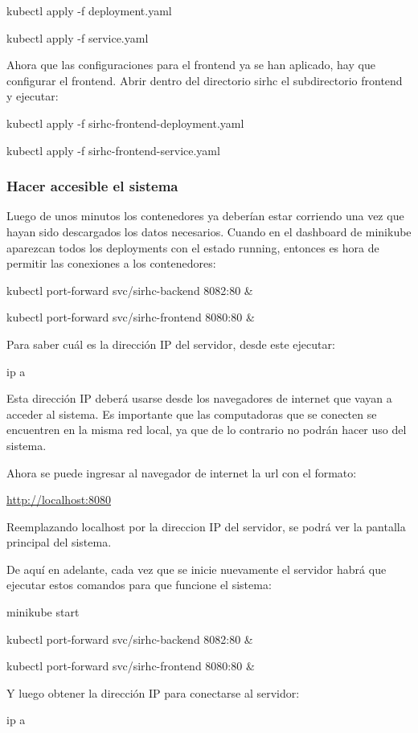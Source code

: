 \documentclass[twoside]{article}
\begin{document}
kubectl apply -f deployment.yaml

kubectl apply -f service.yaml

Ahora que las configuraciones para el frontend ya se han aplicado, hay que configurar el frontend. Abrir dentro del directorio sirhc el subdirectorio frontend y ejecutar:

kubectl apply -f sirhc-frontend-deployment.yaml

kubectl apply -f sirhc-frontend-service.yaml

\subsubsection{Hacer accesible el sistema}
Luego de unos minutos los contenedores ya deberían estar corriendo una vez que hayan sido descargados los datos necesarios. Cuando en el dashboard de minikube aparezcan todos los deployments con el estado running, entonces es hora de permitir las conexiones a los contenedores:

kubectl port-forward svc/sirhc-backend 8082:80 \&

kubectl port-forward svc/sirhc-frontend 8080:80 \&

Para saber cuál es la dirección IP del servidor, desde este ejecutar:

ip a

Esta dirección IP deberá usarse desde los navegadores de internet que vayan a acceder al sistema. Es importante que las computadoras que se conecten se encuentren en la misma red local, ya que de lo contrario no podrán hacer uso del sistema.

Ahora se puede ingresar al navegador de internet la url con el formato:

\href{http://localhost:8080}{http://localhost:8080}

Reemplazando localhost por la direccion IP del servidor, se podrá ver la pantalla principal del sistema.

De aquí en adelante, cada vez que se inicie nuevamente el servidor habrá que ejecutar estos comandos para que funcione el sistema:

minikube start

kubectl port-forward svc/sirhc-backend 8082:80 \&

kubectl port-forward svc/sirhc-frontend 8080:80 \&

Y luego obtener la dirección IP para conectarse al servidor:

ip a
\end{document}
